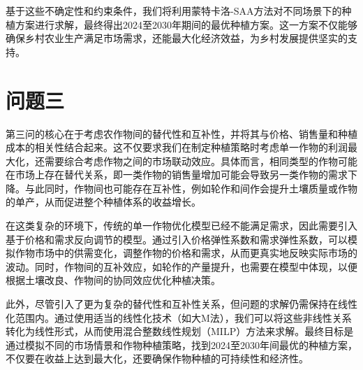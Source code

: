 基于这些不确定性和约束条件，我们将利用蒙特卡洛-SAA方法对不同场景下的种植方案进行求解，最终得出2024至2030年期间的最优种植方案。这一方案不仅能够确保乡村农业生产满足市场需求，还能最大化经济效益，为乡村发展提供坚实的支持。
\section[\hspace{-2pt}问题三]{{\heiti{} \hspace{-8pt}问题三}}\label{section1: 问题三}


第三问的核心在于考虑农作物间的替代性和互补性，并将其与价格、销售量和种植成本的相关性结合起来。这不仅要求我们在制定种植策略时考虑单一作物的利润最大化，还需要综合考虑作物之间的市场联动效应。具体而言，相同类型的作物可能在市场上存在替代关系，即一类作物的销售量增加可能会导致另一类作物的需求下降。与此同时，作物间也可能存在互补性，例如轮作和间作会提升土壤质量或作物的单产，从而促进整个种植体系的收益增长。

在这类复杂的环境下，传统的单一作物优化模型已经不能满足需求，因此需要引入基于价格和需求反向调节的模型。通过引入价格弹性系数和需求弹性系数，可以模拟作物市场中的供需变化，调整作物的价格和需求，从而更真实地反映实际市场的波动。同时，作物间的互补效应，如轮作的产量提升，也需要在模型中体现，以便根据土壤改良、作物间的协同效应优化种植决策。

此外，尽管引入了更为复杂的替代性和互补性关系，但问题的求解仍需保持在线性化范围内。通过使用适当的线性化技术（如大M法），我们可以将这些非线性关系转化为线性形式，从而使用混合整数线性规划（MILP）方法来求解。最终目标是通过模拟不同的市场情景和作物种植策略，找到2024至2030年间最优的种植方案，不仅要在收益上达到最大化，还要确保作物种植的可持续性和经济性。


